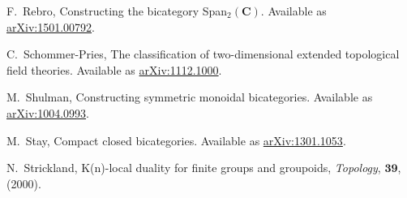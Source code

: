 \documentclass[11pt]{amsart}
\newcommand{\cat}[1]{\mathbf{#1}}
\theoremstyle{remark}
\theoremstyle{definition}
\begin{document}
\begin{thebibliography}{100}
F.~Rebro, 
Constructing the bicategory Span$_{2}(\cat{C})$. 
Available as \href{https://arxiv.org/abs/1501.00792}{arXiv:1501.00792}.

C.~Schommer-Pries,
The classification of two-dimensional extended topological field theories. 
Available as \href{https://arxiv.org/abs/1112.1000}{arXiv:1112.1000}.

M.~Shulman, 
Constructing symmetric monoidal bicategories. 
Available as \href{http://arxiv.org/abs/1004.0993}{arXiv:1004.0993}.

 M.~Stay, 
Compact closed bicategories. 
Available as \href{http://arxiv.org/abs/1301.1053}{arXiv:1301.1053}.

N.\ Strickland,
K(n)-local duality for finite groups and groupoids,
\emph{Topology}, $\mathbf{39}$, (2000).

\end{thebibliography}


%
%
\end{document}
